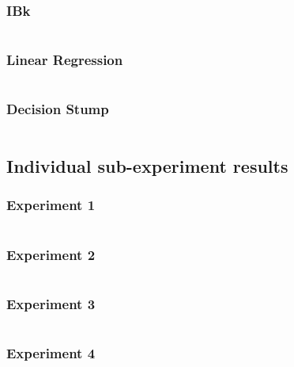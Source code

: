 \subsubsection{IBk}
\inputminted[fontsize=\footnotesize,breaklines=true]{text}{../data/processed/third/unbalanced/numeric-ibk-1.txt}
\clearpage

\subsubsection{Linear Regression}
\inputminted[fontsize=\footnotesize,breaklines=true]{text}{../data/processed/third/unbalanced/numeric-linear-reg.txt}
\clearpage

\subsubsection{Decision Stump}
\inputminted[fontsize=\footnotesize,breaklines=true]{text}{../data/processed/third/unbalanced/numeric-decision-stump.txt}

\subsection{Individual sub-experiment results}
\subsubsection{Experiment 1}
\inputminted[fontsize=\footnotesize,breaklines=true]{text}{../data/processed/third/exp1-balanced.txt}
\clearpage

\subsubsection{Experiment 2}
\inputminted[fontsize=\footnotesize,breaklines=true]{text}{../data/processed/third/exp2-balanced.txt}
\clearpage

\subsubsection{Experiment 3}
\inputminted[fontsize=\footnotesize,breaklines=true]{text}{../data/processed/third/exp3-balanced.txt}
\clearpage

\subsubsection{Experiment 4}
\inputminted[fontsize=\footnotesize,breaklines=true]{text}{../data/processed/third/exp4-balanced.txt}
\clearpage

